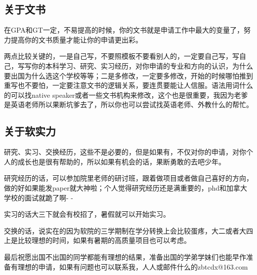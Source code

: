 \subsection{关于文书}
在GPA和GT一定，不易提高的时候，你的文书就是申请工作中最大的变量了，努力提高你的文书质量才能让你的申请更出彩。\par

两点比较关键的，一是自己写，不要照模板不要看别人的，一定要自己写，写自己，写写你的本科学习、研究、实习经历，对你申请的专业和方向的认识，为什么要出国为什么选这个学校等等；二是多修改，一定要多修改，开始的时候哪怕推到重写也不要怕，一定要注意文书的逻辑关系，要连贯要能让人信服。语法用词什么的可以找native speaker或者一些文书机构来修改，这个也是很重要，我因为老爹是英语老师所以果断坑爹去了，所以你也可以尝试找英语老师、外教什么的帮忙。

\subsection{关于软实力}
研究、实习、交换经历，这些不是必要的，但是如果有，不仅对你的申请，对你个人的成长也是很有帮助的，所以如果有机会的话，果断勇敢的去吧少年。\par

研究经历的话，可以参加院里老师的研讨班，跟着做项目或者做自己喜好的方向，做的好如果能发paper就大神啦；个人觉得研究经历还是满重要的，phd和加拿大学校的面试就跪了啊- -\par

实习的话大三下就会有校招了，暑假就可以开始实习。\par

交换的话，说实在的因为软院的三学期制在学分转换上会比较蛋疼，大二或者大四上是比较理想的时间，如果有暑期的高质量项目也可以考虑。\par

最后祝愿出国不出国的同学都能有理想的结果，准备出国的学弟学妹们也能早作准备有理想的申请，如果有问题也可以联系我，人人或邮件什么的zbtcdx@163.com
\clearpage

